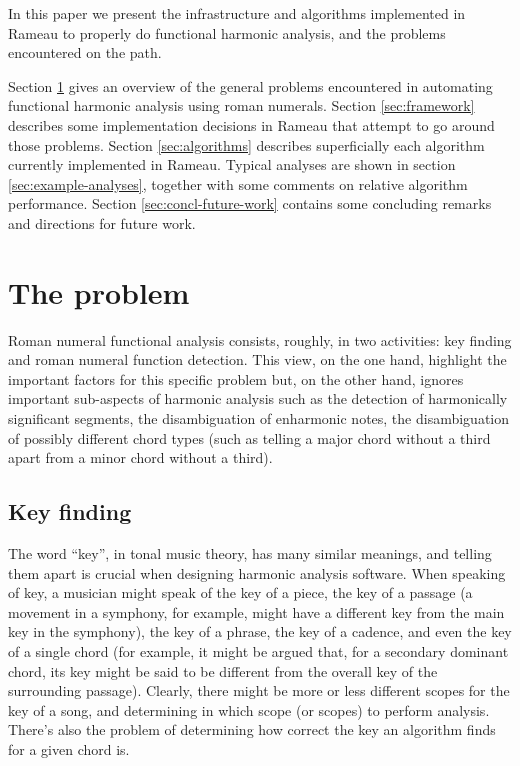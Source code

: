 In this paper we present the infrastructure and algorithms implemented
in Rameau to properly do functional harmonic analysis, and the
problems encountered on the path.

Section \ref{sec:problem} gives an overview of the general problems
encountered in automating functional harmonic analysis using roman
numerals. Section \ref{sec:framework} describes some implementation
decisions in Rameau that attempt to go around those problems. Section
\ref{sec:algorithms} describes superficially each algorithm currently
implemented in Rameau. Typical analyses are shown in section
\ref{sec:example-analyses}, together with some comments on relative
algorithm performance. Section \ref{sec:concl-future-work} contains
some concluding remarks and directions for future work.

\section{The problem}
\label{sec:problem}

Roman numeral functional analysis consists, roughly, in two
activities: key finding and roman numeral function detection. This
view, on the one hand, highlight the important factors for this
specific problem but, on the other hand, ignores important sub-aspects
of harmonic analysis such as the detection of harmonically significant
segments, the disambiguation of enharmonic notes, the disambiguation
of possibly different chord types (such as telling a major chord
without a third apart from a minor chord without a third).

\subsection{Key finding}
\label{sec:key-finding}


The word ``key'', in tonal music theory, has many similar meanings,
and telling them apart is crucial when designing harmonic analysis
software. When speaking of key, a musician might speak of the key of a
piece, the key of a passage (a movement in a symphony, for example,
might have a different key from the main key in the symphony), the key
of a phrase, the key of a cadence, and even the key of a single chord
(for example, it might be argued that, for a secondary dominant chord,
its key might be said to be different from the overall key of the
surrounding passage). Clearly, there might be more or less different
scopes for the key of a song, and determining in which scope (or
scopes) to perform analysis. There's also the problem of determining
how correct the key an algorithm finds for a given chord is.

